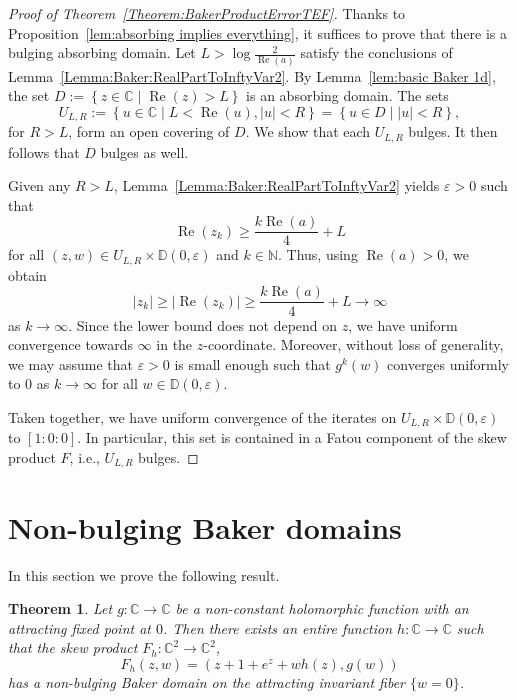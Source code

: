 \documentclass[a4paper, 12pt, twoside]{amsart}
\newtheorem{thm}{Theorem}[section]
\theoremstyle{definition}
\numberwithin{equation}{section}
\renewcommand{\Re}{\operatorname{Re}}
\newcommand{\C}{{\mathbb C}}
\newcommand{\D}{{\mathbb D}}
\begin{document}
\begin{proof}[Proof of Theorem~{\ref{Theorem:BakerProductErrorTEF}}]  
Thanks to Proposition~\ref{lem:absorbing implies everything}, it suffices to prove that there is a bulging absorbing domain. 
	Let $ L > \log \frac{2}{\Re(a)} $ satisfy the conclusions of Lemma~\ref{Lemma:Baker:RealPartToInftyVar2}.
	By Lemma~\ref{lem:basic Baker 1d}, the set $D := \left\lbrace z\in\C\mid \Re(z) > L \right\rbrace$ is an absorbing domain. The sets
	\begin{equation*}
		U_{L, R} := \left\lbrace  u\in \mathbb{C} \mid L < \Re(u), \lvert u \rvert < R \right\rbrace  = \left\lbrace u \in D \mid \lvert u \rvert < R \right\rbrace,
	\end{equation*}
	for $R > L $, form an open covering of $D$. We show that each $U_{L,R}$ bulges. It then follows that $D$ bulges as well.
	
	Given any $R > L$, Lemma~\ref{Lemma:Baker:RealPartToInftyVar2} yields $\varepsilon > 0$ such that
	\begin{equation*}
		\Re(z_k) \geq \frac{k\Re(a)}{4} + L
	\end{equation*}
	for all $(z,w) \in U_{L,R} \times \D(0,\varepsilon)$ and $k\in\mathbb{N}$. Thus, using $\Re(a) > 0$, we obtain
	\begin{equation*}
		\lvert z_k \rvert \geq \lvert \Re(z_k) \rvert \geq \frac{k \Re(a)}{4} + L \to \infty
	\end{equation*}
	as $k\to\infty$. Since the lower bound does not depend on $z$, we have uniform convergence towards $\infty$ in the $z$-coordinate.
	Moreover, without loss of generality, we may assume that $\varepsilon > 0$ is small enough such that $g^k(w)$ converges uniformly to $0$ as $k\to\infty$ for all $w \in \D(0,\varepsilon)$.
	
	Taken together, we have uniform convergence of the iterates on $U_{L,R} \times \D(0,\varepsilon)$ to $[1:0:0]$. In particular, this set is contained in a Fatou component of the skew product $F$, i.e., $U_{L,R}$ bulges.
\end{proof}

\section{Non-bulging Baker domains}\label{non-bulging}
  In this section we prove the following result.
  
\begin{thm}\label{THEOREM:NONBULG:BAKER}
	Let $g\colon\C\to\C$ be a non-constant holomorphic function with an attracting fixed point at $0$.
	Then there exists an entire function $h : \mathbb{C} \to \mathbb{C}$ such that the skew product $F_h \colon \mathbb{C}^2 \to \mathbb{C}^2$,
	\begin{equation*}
		 F_h(z,w) = (z + 1 + e^z + wh(z), g(w))
	\end{equation*}
	has a non-bulging Baker domain on the attracting invariant fiber $\{w = 0\}$.
\end{thm}
\end{document}

